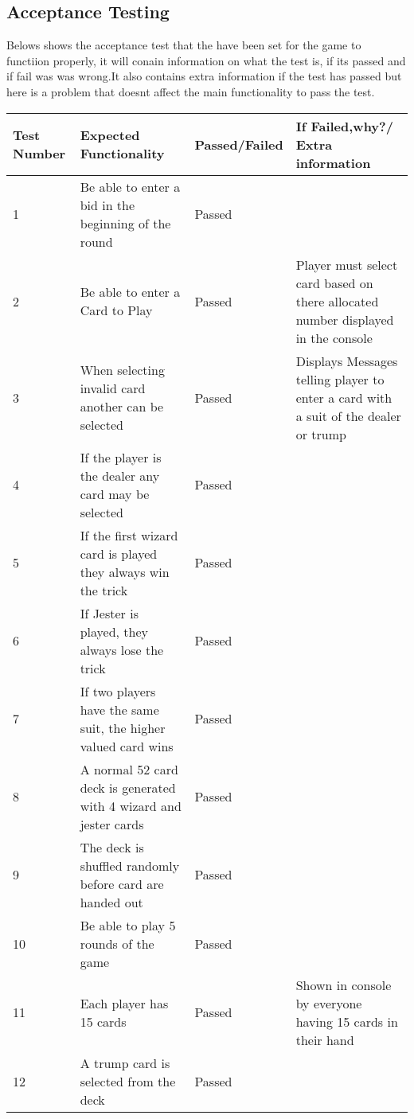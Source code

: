 \subsection{Acceptance Testing}
Belows shows the acceptance test that the have been set for the game to functiion properly, it will conain information on what the test is, if its passed and if fail was was wrong.It also contains extra information if the test has passed but here is a problem that doesnt affect the main functionality to pass the test.
\begin{center}
\begin{tabular}{| l | p{5cm} | l | p{5cm} |}
\hline
Test Number & Expected Functionality & Passed/Failed & If Failed,why?/ Extra information \\ \hline
1 & Be able to enter a bid in the beginning of the round & Passed & ~ \\ \hline
2 & Be able to enter a Card to Play & Passed & Player must select card based on there allocated number displayed in the console \\ \hline
3 & When selecting invalid card another can be selected & Passed & Displays Messages telling player to enter a card with a suit of the dealer or trump \\ \hline
4 & If the player is the dealer any card may be selected & Passed & ~ \\ \hline
5 & If the first wizard card is played they always win the trick & Passed & ~ \\ \hline
6 & If Jester is played, they always lose the trick & Passed & ~ \\ \hline
7 & If two players have the same suit, the higher valued card wins & Passed & ~ \\ \hline
8 & A normal 52 card deck is generated with 4 wizard and jester cards & Passed & ~ \\ \hline
9 & The deck is shuffled randomly before card are handed out & Passed & ~ \\ \hline
10 & Be able to play 5 rounds of the game & Passed & ~ \\ \hline
11 & Each player has 15 cards & Passed & Shown in console by everyone having 15 cards in their hand \\ \hline
12 & A trump card is selected from the deck & Passed & ~ \\ \hline
\end{tabular}
\end{center}
\newpage

